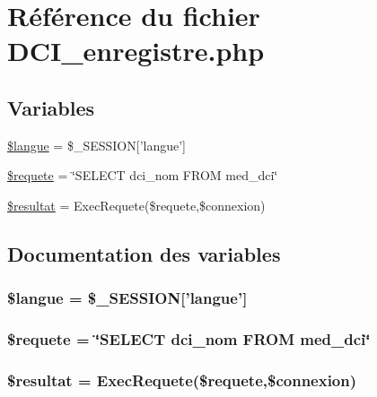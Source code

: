 \hypertarget{DCI__enregistre_8php}{
\section{R\'{e}f\'{e}rence du fichier DCI\_\-enregistre.php}
\label{DCI__enregistre_8php}
}
\subsection*{Variables}
\begin{CompactItemize}
\item 
\hyperlink{DCI__enregistre_8php_a0}{\$langue} = \$\_\-SESSION\mbox{[}'langue'\mbox{]}
\item 
\hyperlink{DCI__enregistre_8php_a1}{\$requete} = \char`\"{}SELECT dci\_\-nom FROM med\_\-dci\char`\"{}
\item 
\hyperlink{DCI__enregistre_8php_a2}{\$resultat} = Exec\-Requete(\$requete,\$connexion)
\end{CompactItemize}


\subsection{Documentation des variables}
\hypertarget{DCI__enregistre_8php_a0}{
\subsubsection[\$langue]{\setlength{\rightskip}{0pt plus 5cm}\$langue = \$\_\-SESSION\mbox{[}'langue'\mbox{]}}}
\label{DCI__enregistre_8php_a0}


\hypertarget{DCI__enregistre_8php_a1}{
\subsubsection[\$requete]{\setlength{\rightskip}{0pt plus 5cm}\$requete = \char`\"{}SELECT dci\_\-nom FROM med\_\-dci\char`\"{}}}
\label{DCI__enregistre_8php_a1}


\hypertarget{DCI__enregistre_8php_a2}{
\subsubsection[\$resultat]{\setlength{\rightskip}{0pt plus 5cm}\$resultat = Exec\-Requete(\$requete,\$connexion)}}
\label{DCI__enregistre_8php_a2}


